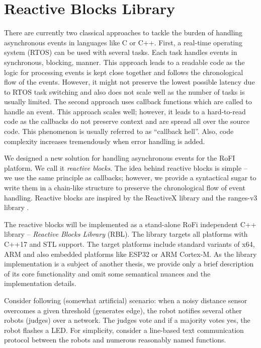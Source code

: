 \section{Reactive Blocks Library} \label{sec:rbl}

There are currently two classical approaches to tackle the burden of handling
asynchronous events in languages like C or C++. First, a real-time operating
system (RTOS) can be used with several tasks. Each task handles events in
synchronous, blocking, manner. This approach leads to a readable code as the
logic for processing events is kept close together and follows the chronological
flow of the events. However, it might not preserve the lowest possible latency
due to RTOS task switching and also does not scale well as the number of tasks
is usually limited. The second approach uses callback functions which are called
to handle an event. This approach scales well; however, it leads to a
hard-to-read code as the callbacks do not preserve context and are spread all
over the source code. This phenomenon is usually referred to as ``callback
hell''. Also, code complexity increases tremendously when error handling is
added.

We designed a new solution for handling asynchronous events for the RoFI
platform. We call it \emph{reactive blocks}. The idea behind reactive blocks is
simple -- we use the same principle as callbacks; however, we provide a
syntactical sugar to write them in a chain-like structure to preserve the
chronological flow of event handling. Reactive blocks are inspired by the
ReactiveX library \cite{noauthor_reactivex_nodate} and the ranges-v3 library
\cite{noauthor_range-v3_nodate}.

The reactive blocks will be implemented as a stand-alone RoFi independent C++
library -- \emph{Reactive Blocks Library} (RBL). The library targets all
platforms with C++17 and STL support. The target platforms include standard
variants of x64, ARM and also embedded platforms like ESP32 or ARM Cortex-M. As
the library implementation is a subject of another thesis, we provide only a
brief description of its core functionality and omit some semantical nuances and
the implementation details.

Consider following (somewhat artificial) scenario: when a noisy distance sensor
overcomes a given threshold (generates edge), the robot notifies several other
robots (judges) over a network. The judges vote and if a majority votes yes, the
robot flashes a LED. For simplicity, consider a line-based text communication
protocol between the robots and numerous reasonably named functions.


